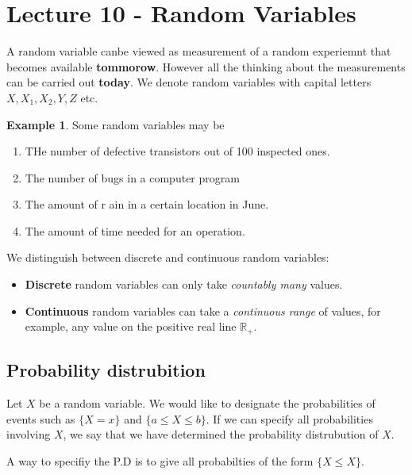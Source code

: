 \documentclass{report}
\theoremstyle{definition}
\newtheorem{definition}{Definition}
\newtheorem{example}{Example}
\theoremstyle{plain}
\theoremstyle{remark}
\begin{document}
\section{Lecture 10 - Random Variables}
A random variable canbe viewed as measurement of a random experiemnt that
becomes available \textbf{tommorow}. However all the thinking about the
measurements can be carried out \textbf{today}. We denote random variables with
capital letters $ X, X_1, X_2, Y, Z $ etc.
\begin{example}
Some random variables may be
\begin{enumerate}
  \item THe number of defective transistors out of 100 inspected ones.
  \item The number of bugs in a computer program
  \item The amount of r ain in a certain location in June.
  \item The amount of time needed for an operation.
\end{enumerate}

We distinguish between discrete and continuous random variables:
\begin{itemize}
  \item \textbf{Discrete} random variables can only take \textit{countably
    many} values.
  \item \textbf{Continuous} random variables can take a \textit{continuous
    range} of values, for example, any value on the positive real line
    $ \mathbb{R}_+ $.
\end{itemize}
\end{example}
\subsection{Probability distrubition}
Let $ X $ be a random variable. We would like to designate the probabilities of
events such as $ \{X = x\} $ and $ \{a \leq X \leq b \} $. If we can specify
all probabilities involving $ X $, we say that we have determined the
probability distrubution of $ X $. 
\par A way to specifiy the P.D is to give all probabilties of the form $ \{X
\leq X\} $.
\begin{center}
\end{center}
\end{document}
